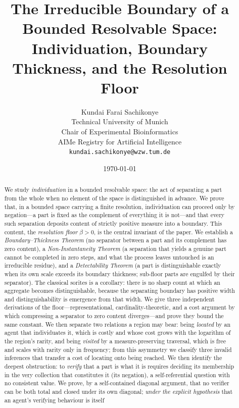 \documentclass[11pt,twocolumn,a4paper]{article}
\title{\textbf{The Irreducible Boundary of a Bounded Resolvable Space:\\[2pt]
Individuation, Boundary Thickness, and the Resolution Floor}}
\author{%
Kundai Farai Sachikonye\\
\small Technical University of Munich\\
\small Chair of Experimental Bioinformatics\\
\small AIMe Registry for Artificial Intelligence\\
\small \texttt{kundai.sachikonye@wzw.tum.de}}
\date{\today}
\theoremstyle{thmstyle}
\theoremstyle{definition}
\theoremstyle{remark}
\newcommand{\thick}{\beta}
\begin{document}
\maketitle

\begin{abstract}
\noindent
We study \emph{individuation} in a bounded resolvable space: the act of
separating a part from the whole when no element of the space is
distinguished in advance. We prove that, in a bounded space carrying a
finite resolution, individuation can proceed only by negation---a part is
fixed as the complement of everything it is not---and that every such
separation deposits content of strictly positive measure into a boundary.
This content, the \emph{resolution floor} $\thick>0$, is the central
invariant of the paper. We establish a \emph{Boundary--Thickness Theorem}
(no separator between a part and its complement has zero content), a
\emph{Non-Instantaneity Theorem} (a separation that yields a genuine part
cannot be completed in zero steps, and what the process leaves untouched is
an irreducible residue), and a \emph{Detectability Theorem} (a part is
distinguishable exactly when its own scale exceeds its boundary thickness;
sub-floor parts are engulfed by their separator). The classical sorites is a
corollary: there is no sharp count at which an aggregate becomes
distinguishable, because the separating boundary has positive width and
distinguishability is emergence from that width. We give three independent
derivations of the floor---representational, cardinality-theoretic, and a
cost argument by which compressing a separator to zero content diverges---and
prove they bound the same constant. We then separate two relations a region may
bear: being \emph{located} by an agent that individuates it, which is costly and
whose cost grows with the logarithm of the region's rarity, and being
\emph{visited} by a measure-preserving traversal, which is free and scales with
rarity only in frequency; from this asymmetry we classify three invalid
inferences that transfer a cost of locating onto being reached. We then identify
the deepest obstruction:
to \emph{verify} that a part is what it is requires deciding its membership
in the very collection that constitutes it (its negation), a self-referential
question with no consistent value. We prove, by a self-contained diagonal
argument, that no verifier can be both total and closed under its own diagonal;
\emph{under the explicit hypothesis} that an agent's verifying behaviour is itself

\end{abstract}
\end{document}
